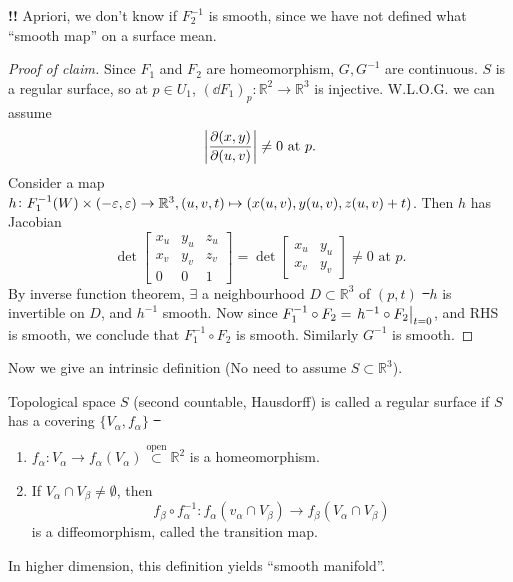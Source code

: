 \textbf{\color{red}!!} Apriori, we don't know if \(F_2^{-1}\) is smooth, since we
have not defined what ``smooth map'' on a surface mean.

\begin{proof}[Proof of claim]
    Since \(F_1\) and \(F_2\) are homeomorphism, \(G,G^{-1}\) are continuous.
    \(S\) is a regular surface, so at \(p\in U_1\), \((\dd{F_1})_p\colon\mathbb{R}^2
    \to \mathbb{R}^3\) is injective. W.L.O.G. we can assume \[
        \left|\pdv{(x,y)}{(u,v)}\right|\neq 0\text{ at }p
    .\] Consider a map \(h\colon F_1^{-1}(W)\times (-\varepsilon,\varepsilon)\to \mathbb{R}^3,
    (u,v,t)\mapsto (x(u,v),y(u,v),z(u,v)+t)\). Then \(h\) has Jacobian \[
        \det \begin{bmatrix}
            x_u & y_u & z_u \\
            x_v & y_v & z_v \\
            0 & 0 & 1
        \end{bmatrix}
        =\det\begin{bmatrix}
            x_u & y_u \\
            x_v & y_v 
        \end{bmatrix}\neq 0 \text{ at }p
    .\] By inverse function theorem, \(\exists\) a neighbourhood \(D\subset
    \mathbb{R}^3\) of \((p,t)\) \st\ \(h\) is invertible on \(D\), and \(h^{-1}\)
    smooth. Now since \(F_1^{-1}\circ F_2=\eval{h^{-1}\circ F_2}_{t=0}\), and RHS
    is smooth, we conclude that \(F_1^{-1}\circ F_2\) is smooth. Similarly \(G^{-1}\)
    is smooth.
\end{proof}

Now we give an intrinsic definition (No need to assume \(S\subset \mathbb{R}^3\)).
\begin{definition}
    Topological space \(S\) (second countable, Hausdorff) is called a regular surface
    if \(S\) has a covering \(\{V_\alpha,f_\alpha\}\) \st\ 
    \begin{enumerate}[(1)]
        \item \(f_\alpha\colon V_\alpha\to f_\alpha(V_\alpha)\overset{\text{open}}
            \subset \mathbb{R}^2\) is a homeomorphism.
        \item If \(V_\alpha\cap V_\beta\neq \emptyset\), then \[
            f_\beta\circ f_\alpha^{-1}\colon f_\alpha(v_\alpha\cap V_\beta)\to 
            f_\beta(V_\alpha\cap V_\beta)
        \] is a diffeomorphism, called the transition map.
    \end{enumerate}
\end{definition}
\begin{remark}
    In higher dimension, this definition yields ``smooth manifold''.
\end{remark}

